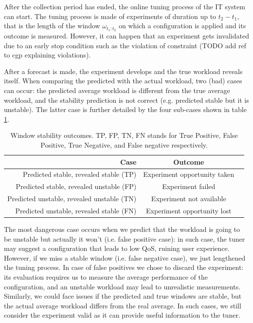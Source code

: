 \documentclass[a4paper]{article} %
\newcommand{\ra}[1]{\renewcommand{\arraystretch}{#1}}
\begin{document}
	 After the collection period has ended, the online tuning process of the IT system can start. The tuning process is made of experiments of duration up to $t_2 - t_1$, that is the length of the window $\omega_{t_1:t_2}$ on which a configuration is applied and its outcome is measured.  However, it can happen that an experiment gets invalidated due to an early stop condition such as the violation of constraint (TODO add ref to cgp explaining violations).  
	 
	 After a forecast is made, the experiment develops and the true workload reveals itself. When comparing the predicted with the actual workload, two (bad) cases can occur: the predicted average workload is different from the true average workload, and the stability prediction is not correct (e.g. predicted stable but it is unstable). The latter case is further detailed by the four sub-cases shown in table \ref{table:stability_cases}. 	 
	 \begin{table}\centering \label{table:stability_cases}
	 	\ra{1.3}
	 	\begin{tabular*}{\textwidth}{@{}rcr@{}}
	 		\toprule
	 		Case & Outcome\\
	 		\midrule
	 		Predicted stable, revealed stable (TP) & Experiment opportunity taken\\
	 		Predicted stable, revealed unstable (FP)& Experiment failed\\
	 		Predicted unstable, revealed unstable (TN)& Experiment not available\\
	 		Predicted unstable, revealed stable (FN)& Experiment opportunity lost\\
	 		\bottomrule
	 	\end{tabular*}
	 	\caption{Window stability outcomes. TP, FP, TN, FN stands for True Positive, False Positive, True Negative, and False negative respectively.}
	 \end{table}
	 The most dangerous case occurs when we predict that the workload is going to be unstable but actually it won't (i.e. false positive case): in such case, the tuner may suggest a configuration that leads to low QoS, ruining user experience. However, if we miss a stable window (i.e. false negative case), we just lengthened the tuning process.
	 In case of false positives we chose to discard the experiment: its evaluation requires us to measure the average performance of the configuration, and an unstable workload may lead to unrealistic measurements.\\
	 Similarly, we could face issues if the predicted and true windows are stable, but the actual average workload differs from the real average. In such cases, we still consider the experiment valid as it can provide useful information to the tuner.
	 
\end{document}
